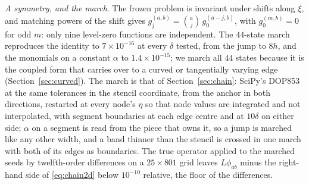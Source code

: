 \documentclass[11pt]{amsart}
\theoremstyle{definition}
\theoremstyle{remark}
\newcommand{\para}[1]{\par\smallskip\noindent\textit{#1}.\enspace}
\newcommand{\sci}[2]{#1 \times 10^{#2}}
\begin{document}
\para{A symmetry, and the march}
The frozen problem is invariant under shifts along $\xi$, and matching
powers of the shift gives
$g_j^{(a, b)} = \binom{a}{j}\, g_0^{(a - j, b)}$, with $g_0^{(m, b)} = 0$ for
odd $m$: only nine level-zero functions are independent. The $44$-state
march reproduces the identity to $\sci{7}{-16}$ at every $\delta$ tested,
from the jump to $8h$, and the monomials on a constant $\alpha$ to
$\sci{1.4}{-15}$; we march all $44$ states because it is the coupled form
that carries over to a curved or tangentially varying edge
(Section~\ref{sec:curved}). The march is that of
Section~\ref{sec:chain}: SciPy's DOP853 at the same tolerances in the
stencil coordinate, from the anchor in both directions, restarted at every
node's $\eta$ so that node values are integrated and not interpolated, with
segment boundaries at each edge centre and at $10\delta$ on either side;
$\alpha$ on a segment is read from the piece that owns it, so a jump is
marched like any other width, and a band thinner than the stencil is crossed
in one march with both of its edges as boundaries. The true operator applied
to the marched seeds by twelfth-order differences on a $25 \times 801$ grid
leaves $L \phi_{ab}$ minus the right-hand side of \eqref{eq:chain2d} below
$10^{-10}$ relative, the floor of the differences.
\end{document}
